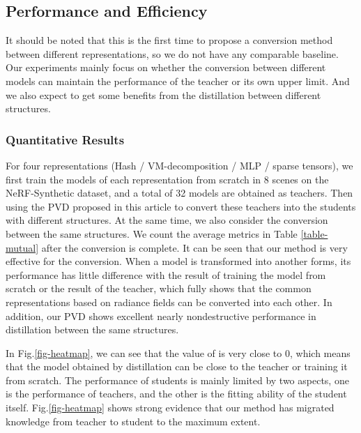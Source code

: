 \documentclass[letterpaper]{article} \usepackage{aaai23}  \usepackage{times}  \usepackage{helvet}  \usepackage{courier}  \usepackage[hyphens]{url}  \usepackage{graphicx} \urlstyle{rm} \def\UrlFont{\rm}  \usepackage{natbib}  \usepackage{caption} \frenchspacing  \setlength{\pdfpagewidth}{8.5in}  \setlength{\pdfpageheight}{11in}  \usepackage{multirow}
\begin{document}
\subsection{Performance and Efficiency}
It should be noted that this is the first time to propose a conversion method between different representations, so we do not have any comparable baseline. Our experiments mainly focus on whether the conversion between different models can maintain the performance of the teacher or its own upper limit. And we also expect to get some benefits from the distillation between different structures.

\subsubsection{Quantitative Results}
For four representations (Hash / VM-decomposition / MLP / sparse tensors), we first train the models of each representation from scratch in 8 scenes on the NeRF-Synthetic dataset, and a total of 32 models are obtained as teachers. Then using the PVD proposed in this article to convert these teachers into the students with different structures. At the same time, we also consider the conversion between the same structures. We count the average metrics in Table \ref{table-mutual} after the conversion is complete. It can be seen that our method is very effective for the conversion. When a model is transformed into another forms, its performance has little difference with the result of training the model from scratch or the result of the teacher, which fully shows that the common representations based on radiance fields can be converted into each other. In addition, our PVD shows excellent nearly nondestructive performance in distillation between the same structures.


In Fig.\ref{fig-heatmap}, we can see that the value of  is very close to 0, which means that the model obtained by distillation can be close to the teacher or training it from scratch. The performance of students is mainly limited by two aspects, one is the performance of teachers, and the other is the fitting ability of the student itself. Fig.\ref{fig-heatmap} shows strong evidence that our method has migrated knowledge from teacher to student to the maximum extent.
\end{document}
